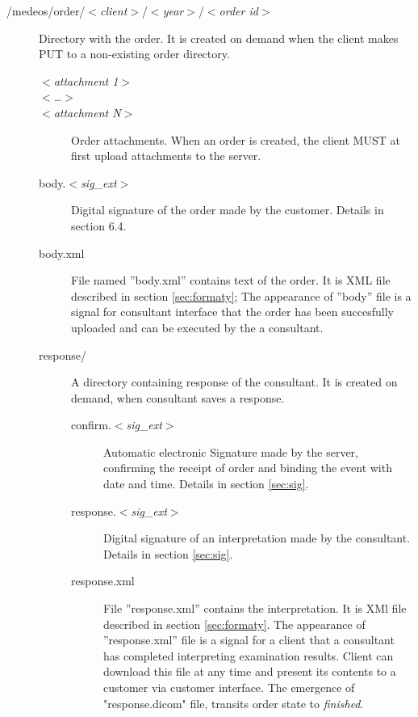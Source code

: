 \documentclass[a4paper]{article}
\begin{document}
\begin{description}
	\item[/medeos/order/$<$\textit{client}$>$/$<$\emph{year}$>$/$<$\textit{order id}$>$]
	Directory with the order. It is created on demand when the client makes PUT to 
	a non-existing order directory.
		\begin{description}
		\item[$<$\textit{attachment 1}$>$]   
		\item[$<$\textit{\ldots}$>$]   
		\item[$<$\textit{attachment N}$>$] Order attachments. When an order is created, 
			the client MUST at first upload attachments to the server.
		\item[body.$<$\textit{sig\_ext}$>$] Digital signature of the order made by the 
			customer. Details in section 6.4.
		\item[body.xml] File named ''body.xml'' contains text of the order. It is XML file 
			described in section \ref{sec:formaty}; The appearance of ''body'' file is a 
			signal for consultant interface that the order has been succesfully uploaded 
			and can be executed by the a consultant.
		\item[response/] A directory containing response of the consultant. It is created on
			demand, when consultant saves a response.
			\begin{description}
			\item[confirm.$<$\textit{sig\_ext}$>$]
			Automatic electronic Signature made by the server, confirming the receipt of 
			order and binding the event with date and time. Details in section \ref{sec:sig}.
			\item[response.$<$\textit{sig\_ext}$>$]
			Digital signature of an interpretation made by the consultant. Details in section 
			\ref{sec:sig}.
			\item[response.xml] File ''response.xml'' contains the interpretation. It is XMl 
			file described
			in section \ref{sec:formaty}. The appearance of ''response.xml'' file is a signal for a
			client that a consultant has completed interpreting examination results. Client 
			can download this file at
			any time and present its contents to a customer via customer interface.
			The emergence of "response.dicom" file, transits order state to \emph{finished}.


\end{description}
\end{description}
\end{description}
\end{document}
